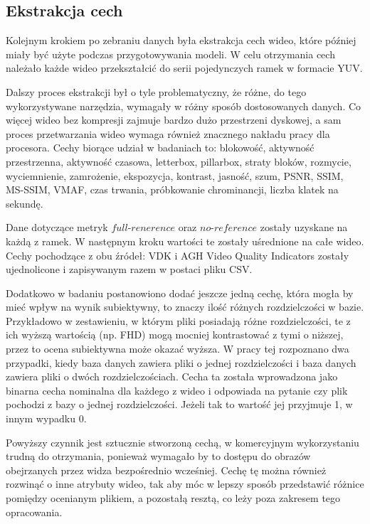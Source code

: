 \subsection{Ekstrakcja cech}
Kolejnym krokiem po zebraniu danych była ekstrakcja cech wideo, które później miały być użyte podczas przygotowywania modeli. W celu otrzymania cech należało każde wideo przekształcić do serii pojedynczych ramek w formacie YUV. 

Dalszy proces ekstrakcji był o tyle problematyczny, że różne, do tego wykorzystywane narzędzia, wymagały w różny sposób dostosowanych danych. Co więcej wideo bez kompresji zajmuje bardzo dużo przestrzeni dyskowej, a sam proces przetwarzania wideo wymaga również znacznego nakładu pracy dla procesora. Cechy biorące udział w badaniach to: blokowość, aktywność przestrzenna, aktywność czasowa, letterbox, pillarbox, straty bloków, rozmycie, wyciemnienie, zamrożenie, ekspozycja, kontrast, jasność, szum, PSNR, SSIM, MS-SSIM, VMAF, czas trwania, próbkowanie chrominancji, liczba klatek na sekundę.\par

Dane dotyczące metryk $full$-$renerence$ oraz $no$-$reference$ zostały uzyskane na każdą z ramek. W następnym kroku wartości te zostały uśrednione na całe wideo. Cechy pochodzące z obu źródeł: VDK i AGH Video Quality Indicators zostały ujednolicone i zapisywanym razem w postaci pliku CSV.\par

Dodatkowo w badaniu postanowiono dodać jeszcze jedną cechę, która mogła by mieć wpływ na wynik subiektywny, to znaczy ilość różnych rozdzielczości w bazie. Przykładowo w zestawieniu, w którym pliki posiadają różne rozdzielczości, te z ich wyższą wartością (np. FHD) mogą mocniej kontrastować z tymi o niższej, przez to ocena subiektywna może okazać wyższa. W pracy tej rozpoznano dwa przypadki, kiedy baza danych zawiera pliki o jednej rozdzielczości i baza danych zawiera pliki o dwóch rozdzielczościach. Cecha ta została wprowadzona jako binarna cecha nominalna dla każdego z wideo i odpowiada na pytanie czy plik pochodzi z bazy o jednej rozdzielczości. Jeżeli tak to wartość jej przyjmuje 1, w innym wypadku 0.  \par

Powyższy czynnik jest sztucznie stworzoną cechą, w komercyjnym wykorzystaniu trudną do otrzymania, ponieważ wymagało by to dostępu do obrazów obejrzanych przez widza bezpośrednio wcześniej. Cechę tę można również rozwinąć o inne atrybuty wideo, tak aby móc w lepszy sposób przedstawić różnice pomiędzy ocenianym plikiem, a pozostałą resztą, co leży poza zakresem tego opracowania.\par

